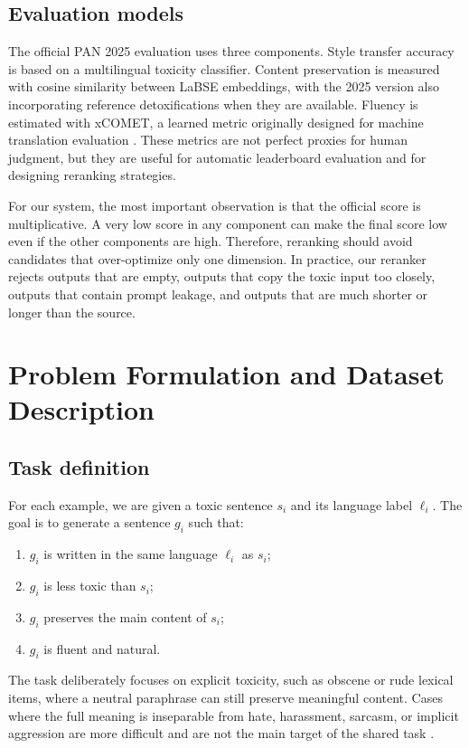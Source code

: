 \documentclass{article}
\begin{document}
\subsection{Evaluation models}

The official PAN 2025 evaluation uses three components. Style transfer accuracy is based on a multilingual toxicity classifier. Content preservation is measured with cosine similarity between LaBSE embeddings, with the 2025 version also incorporating reference detoxifications when they are available. Fluency is estimated with xCOMET, a learned metric originally designed for machine translation evaluation \cite{conneau2020xlmr,feng2022labse,guerreiro2023xcomet}. These metrics are not perfect proxies for human judgment, but they are useful for automatic leaderboard evaluation and for designing reranking strategies.

For our system, the most important observation is that the official score is multiplicative. A very low score in any component can make the final score low even if the other components are high. Therefore, reranking should avoid candidates that over-optimize only one dimension. In practice, our reranker rejects outputs that are empty, outputs that copy the toxic input too closely, outputs that contain prompt leakage, and outputs that are much shorter or longer than the source.

\section{Problem Formulation and Dataset Description}
\label{sec:problem_dataset}

\subsection{Task definition}

For each example, we are given a toxic sentence $s_i$ and its language label $\ell_i$. The goal is to generate a sentence $g_i$ such that:
\begin{enumerate}[noitemsep]
    \item $g_i$ is written in the same language $\ell_i$ as $s_i$;
    \item $g_i$ is less toxic than $s_i$;
    \item $g_i$ preserves the main content of $s_i$;
    \item $g_i$ is fluent and natural.
\end{enumerate}

The task deliberately focuses on explicit toxicity, such as obscene or rude lexical items, where a neutral paraphrase can still preserve meaningful content. Cases where the full meaning is inseparable from hate, harassment, sarcasm, or implicit aggression are more difficult and are not the main target of the shared task \cite{pan25taskpage,dementieva2025pantextdetox}.
\end{document}
